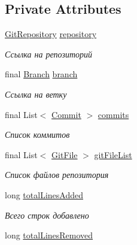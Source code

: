 \subsection*{Private Attributes}
\begin{DoxyCompactItemize}
\item 
\hyperlink{classcom_1_1selesse_1_1gitwrapper_1_1myobjects_1_1_git_repository}{Git\+Repository} \hyperlink{classcom_1_1selesse_1_1gitwrapper_1_1analyzer_1_1_branch_details_a94088bafc3cafc9b2060c526e460d5a8}{repository}
\begin{DoxyCompactList}\small\item\em Ссылка на репозиторий \end{DoxyCompactList}\item 
final \hyperlink{classcom_1_1selesse_1_1gitwrapper_1_1myobjects_1_1_branch}{Branch} \hyperlink{classcom_1_1selesse_1_1gitwrapper_1_1analyzer_1_1_branch_details_a37666451077ef09c1976aaaa20077ed5}{branch}
\begin{DoxyCompactList}\small\item\em Ссылка на ветку \end{DoxyCompactList}\item 
final List$<$ \hyperlink{classcom_1_1selesse_1_1gitwrapper_1_1myobjects_1_1_commit}{Commit} $>$ \hyperlink{classcom_1_1selesse_1_1gitwrapper_1_1analyzer_1_1_branch_details_ac29ec5f3a2db01d208c465070dead2e8}{commits}
\begin{DoxyCompactList}\small\item\em Список коммитов \end{DoxyCompactList}\item 
final List$<$ \hyperlink{classcom_1_1selesse_1_1gitwrapper_1_1myobjects_1_1_git_file}{Git\+File} $>$ \hyperlink{classcom_1_1selesse_1_1gitwrapper_1_1analyzer_1_1_branch_details_a404b15794bd1ddf9d087affb4396e0c7}{git\+File\+List}
\begin{DoxyCompactList}\small\item\em Список файлов репозитория \end{DoxyCompactList}\item 
long \hyperlink{classcom_1_1selesse_1_1gitwrapper_1_1analyzer_1_1_branch_details_a4e6475d5317d63e7c2da31fafb07f66e}{total\+Lines\+Added}
\begin{DoxyCompactList}\small\item\em Всего строк добавлено \end{DoxyCompactList}\item 
long \hyperlink{classcom_1_1selesse_1_1gitwrapper_1_1analyzer_1_1_branch_details_ada3eb664a1747d380e1dfbc8d983e76b}{total\+Lines\+Removed}

\end{DoxyCompactItemize}
